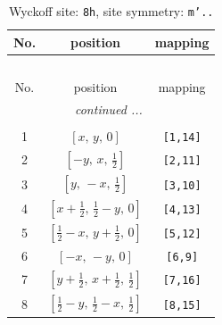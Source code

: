 \documentclass[fleqn,8pt]{jsarticle}
\begin{document}
\begin{longtable}{ccc}
\caption{Wyckoff site: {\tt 8h}, site symmetry: {\tt m'..}}
 \\
 \hline \hline
No. & position & mapping \\ \hline \endfirsthead

\multicolumn{2}{l}{\tablename\ \thetable{}} \\
 \hline \hline
No. & position & mapping \\ \hline \endhead

 \hline \hline
\multicolumn{2}{r}{\footnotesize\it continued ...} \\ \endfoot

 \hline \hline
\multicolumn{2}{r}{} \\ \endlastfoot

1 & $\left[ x,\, y,\, 0 \right]$ & {\tt [1,14]} \\ \hline
2 & $\left[ - y,\, x,\, \frac{1}{2} \right]$ & {\tt [2,11]} \\ \hline
3 & $\left[ y,\, - x,\, \frac{1}{2} \right]$ & {\tt [3,10]} \\ \hline
4 & $\left[ x + \frac{1}{2},\, \frac{1}{2} - y,\, 0 \right]$ & {\tt [4,13]} \\ \hline
5 & $\left[ \frac{1}{2} - x,\, y + \frac{1}{2},\, 0 \right]$ & {\tt [5,12]} \\ \hline
6 & $\left[ - x,\, - y,\, 0 \right]$ & {\tt [6,9]} \\ \hline
7 & $\left[ y + \frac{1}{2},\, x + \frac{1}{2},\, \frac{1}{2} \right]$ & {\tt [7,16]} \\ \hline
8 & $\left[ \frac{1}{2} - y,\, \frac{1}{2} - x,\, \frac{1}{2} \right]$ & {\tt [8,15]} \\
\end{longtable}
\renewcommand{\arraystretch}{1.2}
\end{document}
